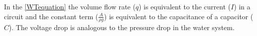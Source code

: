 In the \eqref{WTequation} the volume flow rate ($q$) is equivalent to the current ($I$) in a 
circuit and the constant term \big($\frac{A}{\rho g}$\big) is equivalent to the capacitance of a capacitor ($C$). The voltage drop is analogous to the pressure drop in the water system.

%
%
%
%
%
%
%


